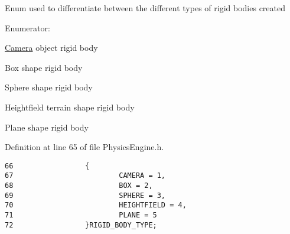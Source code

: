 Enum used to differentiate between the different types of rigid bodies created \begin{Desc}
\item[Enumerator: ]\par
\begin{description}
\item[{\em 
\hypertarget{class_physics_engine_f9cf664e8df4f9a518448aa1229570775b12039b51b36d92231a67695ea07e28}{
CAMERA}
\label{class_physics_engine_f9cf664e8df4f9a518448aa1229570775b12039b51b36d92231a67695ea07e28}
}]\hyperlink{class_camera}{Camera} object rigid body \item[{\em 
\hypertarget{class_physics_engine_f9cf664e8df4f9a518448aa122957077219567afcdbe1eb7fe073c81b43dd5c0}{
BOX}
\label{class_physics_engine_f9cf664e8df4f9a518448aa122957077219567afcdbe1eb7fe073c81b43dd5c0}
}]Box shape rigid body \item[{\em 
\hypertarget{class_physics_engine_f9cf664e8df4f9a518448aa122957077d3a5fc2a81d07760aa5d18bb1b79cd9b}{
SPHERE}
\label{class_physics_engine_f9cf664e8df4f9a518448aa122957077d3a5fc2a81d07760aa5d18bb1b79cd9b}
}]Sphere shape rigid body \item[{\em 
\hypertarget{class_physics_engine_f9cf664e8df4f9a518448aa122957077504250562f6fb421a154714f65c870ad}{
HEIGHTFIELD}
\label{class_physics_engine_f9cf664e8df4f9a518448aa122957077504250562f6fb421a154714f65c870ad}
}]Heightfield terrain shape rigid body \item[{\em 
\hypertarget{class_physics_engine_f9cf664e8df4f9a518448aa122957077c9cfd25eead0581ed6bd4050b3cfbe13}{
PLANE}
\label{class_physics_engine_f9cf664e8df4f9a518448aa122957077c9cfd25eead0581ed6bd4050b3cfbe13}
}]Plane shape rigid body \end{description}
\end{Desc}



Definition at line 65 of file PhysicsEngine.h.

\begin{Code}\begin{verbatim}66                 {
67                         CAMERA = 1,                     
68                         BOX = 2,                        
69                         SPHERE = 3,                     
70                         HEIGHTFIELD = 4,        
71                         PLANE = 5                       
72                 }RIGID_BODY_TYPE;
\end{verbatim}
\end{Code}





